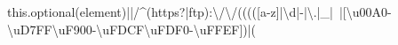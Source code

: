 this.optional(element)||/^(https?|ftp):\textbackslash{}/\textbackslash{}/(((([a-z]|\textbackslash{}d|-|\textbackslash{}.|_|~|[\textbackslash{}u00A0-\textbackslash{}uD7FF\textbackslash{}uF900-\textbackslash{}uFDCF\textbackslash{}uFDF0-\textbackslash{}uFFEF])|(%